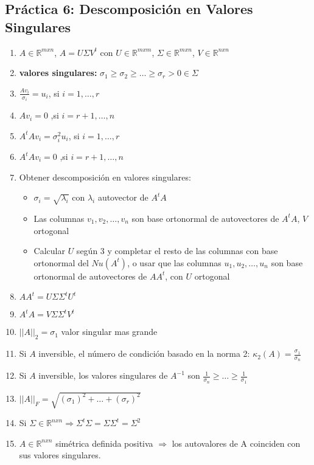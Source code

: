 \subsection*{Práctica 6: Descomposición en Valores Singulares}
\begin{enumerate}
    \item $A \in \mathbb{R}^{mxn}$, $A=U\Sigma V^t$ con  $U \in \mathbb{R}^{mxm}$, $\Sigma \in \mathbb{R}^{mxn}$, $V\in \mathbb{R}^{nxn}$
    \item \textbf{valores singulares: }$\sigma_1 \geq \sigma_2 \geq \dots \geq \sigma_r > 0 \in \Sigma$
    \item $\frac{Av_i}{\sigma_i} = u_i$, si $i = 1, \dots, r$
    \item $Av_i = 0$ ,si $i = r+1, \dots, n$
    \item $A^tAv_i = \sigma_i^2 u_i$, si $i = 1, \dots, r$
    \item $A^tAv_i = 0$ ,si $i = r+1, \dots, n$
    \item Obtener descomposición en valores singulares:
    \begin{itemize}
        \item $\sigma_i = \sqrt{\lambda_i}$ con $\lambda_i$ autovector de $A^tA$ 
        \item Las columnas $v_1, v_2, \dots, v_n$ son base ortonormal de autovectores de $A^tA$, $V$ ortogonal
        \item Calcular $U$ según 3 y completar el resto de las columnas con base ortonormal del $Nu(A^t)$, o usar que las columnas $u_1, u_2, \dots, u_n$ son base ortonormal de autovectores de $AA^t$, con $U$ ortogonal
    \end{itemize}
    \item $AA^t = U \Sigma \Sigma^t U^t$
    \item $A^tA = V \Sigma \Sigma^t V^t$
    \item $||A||_2 = \sigma_1$ valor singular mas grande
    \item Si $A$ inversible, el número de condición basado en la norma 2: $\kappa_2(A) = \frac{\sigma_1}{\sigma_n}$
    \item Si $A$ inversible, los valores singulares de $A^{-1}$ son $\frac{1}{\sigma_n} \geq \dots \geq \frac{1}{\sigma_1} $
    \item $||A||_F = \sqrt{(\sigma_1)^2 + \dots + (\sigma_r)^2}$
    \item Si $\Sigma \in \mathbb{R}^{nxn} \Rightarrow \Sigma^t \Sigma = \Sigma \Sigma^t = \Sigma^2$ 
    \item $A \in \mathbb{R}^{nxn}$ simétrica definida positiva $\Rightarrow$ los autovalores de A coinciden con sus valores singulares. 
\end{enumerate}
